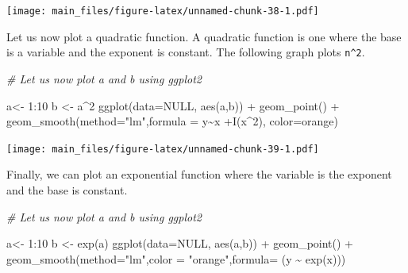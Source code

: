 \documentclass[
]{book}
\newenvironment{Shaded}{\begin{snugshade}}{\end{snugshade}}
\newcommand{\AttributeTok}[1]{\textcolor[rgb]{0.77,0.63,0.00}{#1}}
\newcommand{\CommentTok}[1]{\textcolor[rgb]{0.56,0.35,0.01}{\textit{#1}}}
\newcommand{\ConstantTok}[1]{\textcolor[rgb]{0.00,0.00,0.00}{#1}}
\newcommand{\DecValTok}[1]{\textcolor[rgb]{0.00,0.00,0.81}{#1}}
\newcommand{\FunctionTok}[1]{\textcolor[rgb]{0.00,0.00,0.00}{#1}}
\newcommand{\NormalTok}[1]{#1}
\newcommand{\OtherTok}[1]{\textcolor[rgb]{0.56,0.35,0.01}{#1}}
\newcommand{\SpecialCharTok}[1]{\textcolor[rgb]{0.00,0.00,0.00}{#1}}
\newcommand{\StringTok}[1]{\textcolor[rgb]{0.31,0.60,0.02}{#1}}
\begin{document}
\texttt{[image: main\_files/figure-latex/unnamed-chunk-38-1.pdf]}

Let us now plot a quadratic function. A quadratic function is one where the base is a variable and the exponent is constant. The following graph plots \texttt{n\^{}2}.

\begin{Shaded}
\begin{Highlighting}[]
\CommentTok{\# Let us now plot a and b using ggplot2}

\NormalTok{a}\OtherTok{\textless{}{-}} \DecValTok{1}\SpecialCharTok{:}\DecValTok{10}
\NormalTok{b }\OtherTok{\textless{}{-}}\NormalTok{ a}\SpecialCharTok{\^{}}\DecValTok{2}
\FunctionTok{ggplot}\NormalTok{(}\AttributeTok{data=}\ConstantTok{NULL}\NormalTok{, }\FunctionTok{aes}\NormalTok{(a,b)) }\SpecialCharTok{+}
  \FunctionTok{geom\_point}\NormalTok{() }\SpecialCharTok{+}
  \FunctionTok{geom\_smooth}\NormalTok{(}\AttributeTok{method=}\StringTok{"lm"}\NormalTok{,}\AttributeTok{formula =}\NormalTok{ y}\SpecialCharTok{\textasciitilde{}}\NormalTok{x }\SpecialCharTok{+}\FunctionTok{I}\NormalTok{(x}\SpecialCharTok{\^{}}\DecValTok{2}\NormalTok{), }\AttributeTok{color=}\StringTok{\textquotesingle{}orange\textquotesingle{}}\NormalTok{)}
\end{Highlighting}
\end{Shaded}

\texttt{[image: main\_files/figure-latex/unnamed-chunk-39-1.pdf]}

Finally, we can plot an exponential function where the variable is the exponent and the base is constant.

\begin{Shaded}
\begin{Highlighting}[]
\CommentTok{\# Let us now plot a and b using ggplot2}

\NormalTok{a}\OtherTok{\textless{}{-}} \DecValTok{1}\SpecialCharTok{:}\DecValTok{10}
\NormalTok{b }\OtherTok{\textless{}{-}} \FunctionTok{exp}\NormalTok{(a)}
\FunctionTok{ggplot}\NormalTok{(}\AttributeTok{data=}\ConstantTok{NULL}\NormalTok{, }\FunctionTok{aes}\NormalTok{(a,b)) }\SpecialCharTok{+}
  \FunctionTok{geom\_point}\NormalTok{() }\SpecialCharTok{+}
  \FunctionTok{geom\_smooth}\NormalTok{(}\AttributeTok{method=}\StringTok{"lm"}\NormalTok{,}\AttributeTok{color =} \StringTok{"orange"}\NormalTok{,}\AttributeTok{formula=}\NormalTok{ (y }\SpecialCharTok{\textasciitilde{}} \FunctionTok{exp}\NormalTok{(x)))}
\end{Highlighting}
\end{Shaded}
\end{document}
